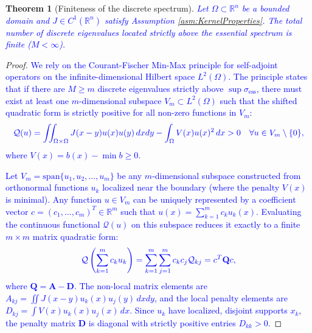 \documentclass[12pt, a4paper]{article}
\newcommand{\revision}[1]{\textcolor{blue}{#1}}
\theoremstyle{break}
\newtheorem{thm}{Theorem}[section]
\theoremstyle{break}
\theoremstyle{break}
\theoremstyle{break}
\theoremstyle{break}
\theoremstyle{break}
\theoremstyle{break}
\theoremstyle{break}
\theoremstyle{break}
\begin{document}
\begin{thm}[Finiteness of the discrete spectrum]
    \label{thm:finiteness_continuous}
    \revision{Let $\Omega \subset \mathbb{R}^n$ be a bounded domain and $J \in C^1(\mathbb{R}^n)$ satisfy Assumption \ref{asm:KernelProperties}. The total number of discrete eigenvalues located strictly above the essential spectrum is finite ($M < \infty$).}
\end{thm}
\begin{proof}
    \revision{We rely on the Courant-Fischer Min-Max principle for self-adjoint operators on the infinite-dimensional Hilbert space $L^2(\Omega)$. The principle states that if there are $M \ge m$ discrete eigenvalues strictly above $\sup \sigma_{\mathrm{ess}}$, there must exist at least one $m$-dimensional subspace $V_m \subset L^2(\Omega)$ such that the shifted quadratic form is strictly positive for all non-zero functions in $V_m$:}
    \begin{equation} \label{eq:minmax}
        \revision{\mathcal{Q}(u) = \iint_{\Omega \times \Omega} J(x-y)u(x)u(y) \,dx dy - \int_\Omega V(x) u(x)^2 \,dx > 0 \quad \forall u \in V_m \setminus \{0\},}
    \end{equation}
    \revision{where $V(x) = b(x) - \min b \ge 0$.}
    
    \revision{Let $V_m = \mathrm{span}\{u_1, u_2, \dots, u_m\}$ be any $m$-dimensional subspace constructed from orthonormal functions $u_k$ localized near the boundary (where the penalty $V(x)$ is minimal). Any function $u \in V_m$ can be uniquely represented by a coefficient vector $c = (c_1, \dots, c_m)^T \in \mathbb{R}^m$ such that $u(x) = \sum_{k=1}^m c_k u_k(x)$. Evaluating the continuous functional $\mathcal{Q}(u)$ on this subspace reduces it exactly to a finite $m \times m$ matrix quadratic form:}
    \begin{equation}
        \revision{\mathcal{Q}\left(\sum_{k=1}^m c_k u_k\right) = \sum_{k=1}^m \sum_{j=1}^m c_k c_j \mathcal{Q}_{kj} = c^T \mathbf{Q} c,}
    \end{equation}
    \revision{where $\mathbf{Q} = \mathbf{A} - \mathbf{D}$. The non-local matrix elements are $A_{kj} = \iint J(x-y) u_k(x)u_j(y) \,dx dy$, and the local penalty elements are $D_{kj} = \int V(x) u_k(x)u_j(x) \,dx$. Since $u_k$ have localized, disjoint supports $x_k$, the penalty matrix $\mathbf{D}$ is diagonal with strictly positive entries $D_{kk} > 0$.}
    

\end{proof}
\end{document}
